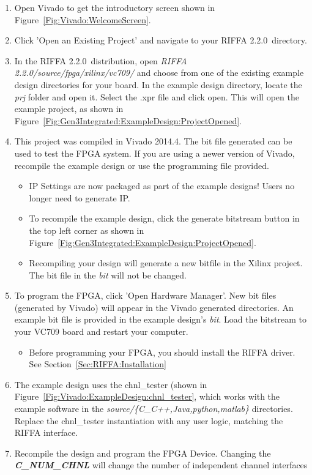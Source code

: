 \documentclass{refrep}
\newcommand{\VivadoVer}{2014.4}
\newcommand{\RIFFAVer}{2.2.0}
\newcommand{\Directory}[1]{\textit{#1}}
\newcommand{\RIFFAParameter}[1]{\textit{\textbf{#1}}}
\begin{document}
\begin{enumerate}
\item Open Vivado to get the introductory screen shown in
  Figure~\ref{Fig:Vivado:WelcomeScreen}.
\item Click 'Open an Existing Project' and navigate to your RIFFA
  \RIFFAVer~directory.
\item In the RIFFA \RIFFAVer~distribution, open \Directory{RIFFA
  \RIFFAVer/source/fpga/xilinx/vc709/} and choose from one of the existing
  example design directories for your board. In the example design directory,
  locate the \Directory{prj} folder and open it. Select the .xpr file and click
  open. This will open the example project, as shown in
  Figure~\ref{Fig:Gen3Integrated:ExampleDesign:ProjectOpened}.
\item This project was compiled in Vivado \VivadoVer. The bit file generated can
  be used to test the FPGA system. If you are using a newer version of Vivado,
  recompile the example design or use the programming file provided.
  \begin{itemize}
  \item IP Settings are now packaged as part of the example designs! Users no
    longer need to generate IP.
  \item To recompile the example design, click the generate bitstream button in
    the top left corner as shown in
    Figure~\ref{Fig:Gen3Integrated:ExampleDesign:ProjectOpened}.
  \item Recompiling your design will generate a new bitfile in the Xilinx
    project. The bit file in the \Directory{bit} will not be changed.
  \end{itemize}
\item To program the FPGA, click 'Open Hardware Manager'. New bit files
  (generated by Vivado) will appear in the Vivado generated directories. An
  example bit file is provided in the example design's \Directory{bit}. Load the
  bitstream to your VC709 board and restart your computer.
  \begin{itemize}
  \item Before programming your FPGA, you should install the RIFFA driver. See
    Section~\ref{Sec:RIFFA:Installation}
  \end{itemize}
\item The example design uses the chnl\_tester (shown in
  Figure~\ref{Fig:Vivado:ExampleDesign:chnl_tester}, which works with
  the example software in the \Directory{source/\{C\_C++,Java,python,matlab\}}
  directories. Replace the chnl\_tester instantiation with any user logic,
  matching the RIFFA interface.
\item Recompile the design and program the FPGA Device. Changing the
  \RIFFAParameter{C\_NUM\_CHNL} will change the number of independent channel
  interfaces
\end{enumerate}
\end{document}
